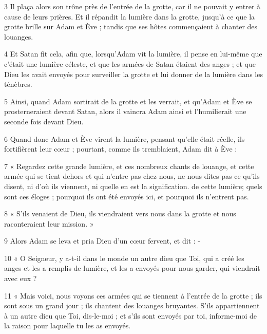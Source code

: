 \par 3 Il plaça alors son trône près de l'entrée de la grotte, car il ne pouvait y entrer à cause de leurs prières. Et il répandit la lumière dans la grotte, jusqu'à ce que la grotte brille sur Adam et Ève ; tandis que ses hôtes commençaient à chanter des louanges.

\par 4 Et Satan fit cela, afin que, lorsqu'Adam vit la lumière, il pense en lui-même que c'était une lumière céleste, et que les armées de Satan étaient des anges ; et que Dieu les avait envoyés pour surveiller la grotte et lui donner de la lumière dans les ténèbres.

\par 5 Ainsi, quand Adam sortirait de la grotte et les verrait, et qu'Adam et Ève se prosterneraient devant Satan, alors il vaincra Adam ainsi et l'humilierait une seconde fois devant Dieu.

\par 6 Quand donc Adam et Ève virent la lumière, pensant qu'elle était réelle, ils fortifièrent leur cœur ; pourtant, comme ils tremblaient, Adam dit à Ève :

\par 7 « Regardez cette grande lumière, et ces nombreux chants de louange, et cette armée qui se tient dehors et qui n'entre pas chez nous, ne nous dites pas ce qu'ils disent, ni d'où ils viennent, ni quelle en est la signification. de cette lumière; quels sont ces éloges ; pourquoi ils ont été envoyés ici, et pourquoi ils n’entrent pas.

\par 8 « S'ils venaient de Dieu, ils viendraient vers nous dans la grotte et nous raconteraient leur mission. »

\par 9 Alors Adam se leva et pria Dieu d'un cœur fervent, et dit : -

\par 10 « O Seigneur, y a-t-il dans le monde un autre dieu que Toi, qui a créé les anges et les a remplis de lumière, et les a envoyés pour nous garder, qui viendrait avec eux ?

\par 11 « Mais voici, nous voyons ces armées qui se tiennent à l'entrée de la grotte ; ils sont sous un grand jour ; ils chantent des louanges bruyantes. S'ils appartiennent à un autre dieu que Toi, dis-le-moi ; et s'ils sont envoyés par toi, informe-moi de la raison pour laquelle tu les as envoyés.

